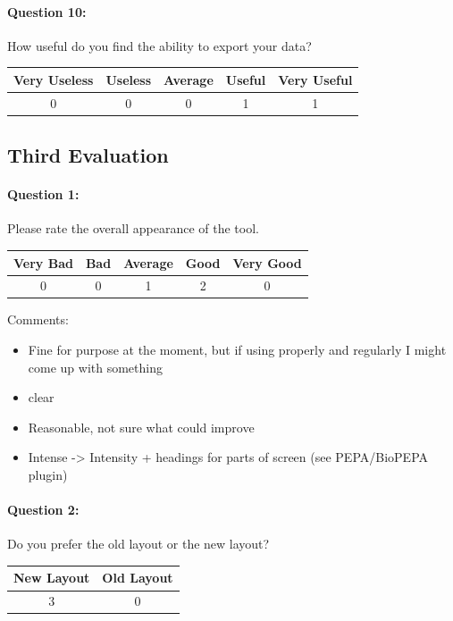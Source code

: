 \paragraph*{Question 10: } How useful do you find the ability to export your data?
\begin{center}
\begin{tabular}{ | c | c | c | c | c |}
    \hline
    Very Useless & Useless  & Average & Useful & Very Useful \\
    \hline
    0 & 0 & 0 & 1 & 1 \\
    \hline
\end{tabular}
\end{center}


\clearpage
\subsection{Third Evaluation}

\paragraph*{Question 1: } Please rate the overall appearance of the tool.

\begin{center}
\begin{tabular}{ | c | c | c | c | c |}
    \hline
    Very Bad & Bad & Average & Good & Very Good \\
    \hline
    0 & 0 & 1 & 2 & 0 \\
    \hline
\end{tabular}
\end{center}

Comments:
\begin{itemize}
\item Fine for purpose at the moment, but if using properly and regularly I might come up with something
\item clear
\item Reasonable, not sure what could improve
\item Intense -> Intensity + headings for parts of screen (see PEPA/BioPEPA plugin)
\end{itemize}


\paragraph*{Question 2: } Do you prefer the old layout or the new layout?

\begin{center}
\begin{tabular}{ | c | c |}
    \hline
    New Layout & Old Layout\\
    \hline
    3 & 0 \\
    \hline
\end{tabular}
\end{center}

